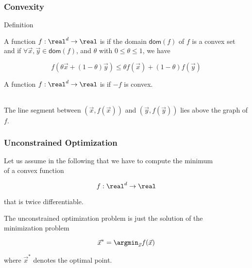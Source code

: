 \begin{frame}
  \frametitle{Convexity}

  \begin{citeblock}{Definition}

    A function $f: \real^d \rightarrow \real$ is  if the domain $\mathsf{dom}(f)$ of $f$ is a convex set \\
    and if $\forall \vec x, \vec y \in \mathsf{dom}(f)$, and $\theta$ with $0 \leq \theta \leq 1$, we have

    \begin{displaymath}
      f(\theta \vec x + (1-\theta) \vec y) \leq \theta f(\vec x) + (1-\theta) f(\vec y)
    \end{displaymath}
    \pause

    A function $f: \real^d \rightarrow \real$ is  if $-f$ is convex.

  \end{citeblock}
  \pause
  \vspace{0.5cm}

   \\[.25cm]

  The line segment between $(\vec x, f(\vec x))$ and $(\vec y, f(\vec y))$ lies above the graph of $f$.
\end{frame}


\begin{frame}
  \frametitle{Unconstrained Optimization}
 
  Let us assume in the following that we have to compute the minimum \\
  of a convex function

  \begin{displaymath}
    f: \real^d \rightarrow \real
  \end{displaymath}

  that is twice differentiable. \\[.25cm] \pause

  The unconstrained optimization problem is just the solution of the\\
  minimization problem

  \begin{displaymath}
    \vec x^* = \argmin_{\vec x} f(\vec x)
  \end{displaymath}

  where $\vec x^*$ denotes the optimal point.
\end{frame}


